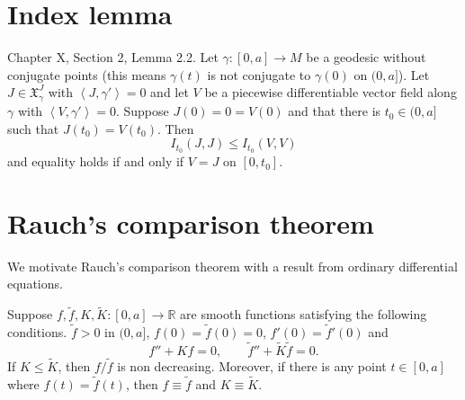 \section{Index lemma}
\label{section-index-lemma}

\begin{lemma}[Index]
\label{lemma-index}
\cite{doc} Chapter X, Section 2, Lemma 2.2.
Let $\gamma:[0,a]\to M$ be a
geodesic without conjugate points (this means
$\gamma(t)$ is not conjugate to
$\gamma(0)$ on $(0,a]$). Let
$J\in\mathfrak{X}_\gamma^J$ with
$\left\langle{}J,\gamma'\right\rangle{}=0$ and let $V$ be a
piecewise differentiable vector
field along $\gamma$ with
$\left\langle{}V,\gamma'\right\rangle{}=0$. Suppose
$J(0)=0=V(0)$ and
that there is  $t_0\in(0,a]$ such that
$J(t_0)=V(t_0)$. Then
$$
I_{t_0}(J,J)\leq I_{t_0}(V,V)
$$
and equality holds if and only if $V=J$ on
$[0,t_0]$.
\end{lemma}

\section{Rauch's comparison theorem}
\label{section-Rauch}

We motivate Rauch's comparison theorem with a
result from ordinary
differential equations.

\begin{theorem}[Sturm]
\label{theorem-Sturm}
Suppose $f,\tilde{f},K,\tilde{K}:[0,a]\to
\mathbb{R}$ are smooth functions
satisfying the following conditions.
$\tilde{f} > 0$ in $(0,a]$,
$f(0)=\tilde{f}(0)=0$,
$f'(0)=\tilde{f}'(0)$ and
$$
f''+Kf=0,\qquad
\tilde{f}''+\tilde{K}\tilde{f}=0.
$$
If $K\leq \tilde{K}$, then $f/\tilde{f}$ is
non decreasing. Moreover, if there
is any point $t \in [0,a]$ where
$f(t)=\tilde{f}(t)$, then $f \equiv
\tilde{f}$
and $K \equiv \tilde{K}$.
\end{theorem}

